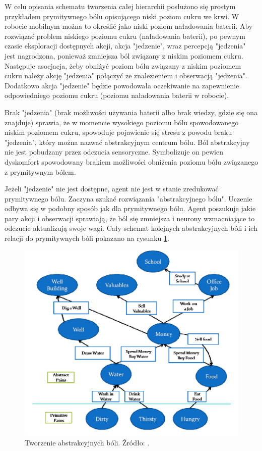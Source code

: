 W celu opisania schematu tworzenia całej hierarchii posłużono się prostym 
przykładem prymitywnego bólu opisującego niski poziom cukru we krwi. W robocie 
mobilnym można to określić jako niski poziom naładowania baterii. Aby rozwiązać 
problem niskiego poziomu cukru (naładowania baterii), po pewnym czasie 
eksploracji dostępnych akcji, akcja "jedzenie", wraz percepcją "jedzenia" jest 
nagrodzona, ponieważ zmniejsza ból związany z niskim poziomem cukru. Następuje 
asocjacja, żeby obniżyć poziom bólu związany z niskim poziomem cukru należy 
akcję "jedzenia" połączyć ze znalezieniem i obserwacją "jedzenia". Dodatkowo 
akcja "jedzenie" będzie powodowała oczekiwanie na zapewnienie odpowiedniego 
poziomu cukru (poziomu naładowania baterii w robocie).

Brak "jedzenia" (brak możliwości używania baterii albo brak wiedzy, gdzie się 
ona znajduje) sprawia, że w momencie wysokiego poziomu bólu spowodowanego 
niskim poziomem cukru, spowoduje pojawienie się stresu z powodu braku 
"jedzenia", który można nazwać abstrakcyjnym centrum bólu. Ból abstrakcyjny nie 
jest pobudzany przez odczucia sensoryczne. Symbolizuje on pewien dyskomfort 
spowodowany brakiem możliwości obniżenia poziomu bólu związanego z prymitywnym 
bólem.

Jeżeli "jedzenie" nie jest dostępne, agent nie jest w stanie zredukować 
prymitywnego bólu. Zaczyna szukać rozwiązania "abstrakcyjnego bólu". Uczenie 
odbywa się w podobny sposób jak dla prymitywnego bólu. Agent poszukuje jakie 
pary akcji i obserwacji sprawiają, że ból się zmniejsza i neurony wzmacniające 
to odczucie aktualizują swoje wagi. Cały schemat kolejnych abstrakcyjnych bóli 
i ich relacji do prymitywnych bóli pokazano na rysunku 
\ref{fig:abstractpaincreationcomplex}.

\begin{figure}[H]
	\centering
	\includegraphics[width=0.7\linewidth]{rozdzial2/images/abstract_pain_creation_complex}
	\caption{Tworzenie abstrakcyjnych bóli. Źródło: \cite{ml_comp_int}.}
	\label{fig:abstractpaincreationcomplex}
\end{figure}

